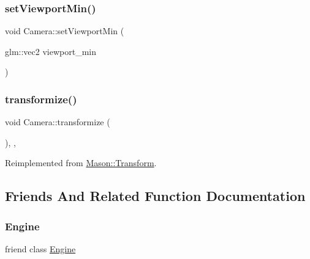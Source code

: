 \hypertarget{class_mason_1_1_camera_aa630259d7e0c0124dec5c9aaf33b7160}{}\label{class_mason_1_1_camera_aa630259d7e0c0124dec5c9aaf33b7160} 
\subsubsection{\texorpdfstring{set\+Viewport\+Min()}{setViewportMin()}}
{\footnotesize\ttfamily void Camera\+::set\+Viewport\+Min (\begin{DoxyParamCaption}\item[{glm\+::vec2}]{viewport\+\_\+min }\end{DoxyParamCaption})}

\hypertarget{class_mason_1_1_camera_a27ff2d3ad004a49db2ae508ac6e9d3c2}{}\label{class_mason_1_1_camera_a27ff2d3ad004a49db2ae508ac6e9d3c2} 
\subsubsection{\texorpdfstring{transformize()}{transformize()}}
{\footnotesize\ttfamily void Camera\+::transformize (\begin{DoxyParamCaption}{ }\end{DoxyParamCaption})\hspace{0.3cm}{\ttfamily [override]}, {\ttfamily [protected]}, {\ttfamily [virtual]}}



Reimplemented from \hyperlink{class_mason_1_1_transform_a4dd61568d49044377f3312397ffdafd1}{Mason\+::\+Transform}.



\subsection{Friends And Related Function Documentation}
\hypertarget{class_mason_1_1_camera_a3e1914489e4bed4f9f23cdeab34a43dc}{}\label{class_mason_1_1_camera_a3e1914489e4bed4f9f23cdeab34a43dc} 
\subsubsection{\texorpdfstring{Engine}{Engine}}
{\footnotesize\ttfamily friend class \hyperlink{class_mason_1_1_engine}{Engine}\hspace{0.3cm}{\ttfamily [friend]}}

